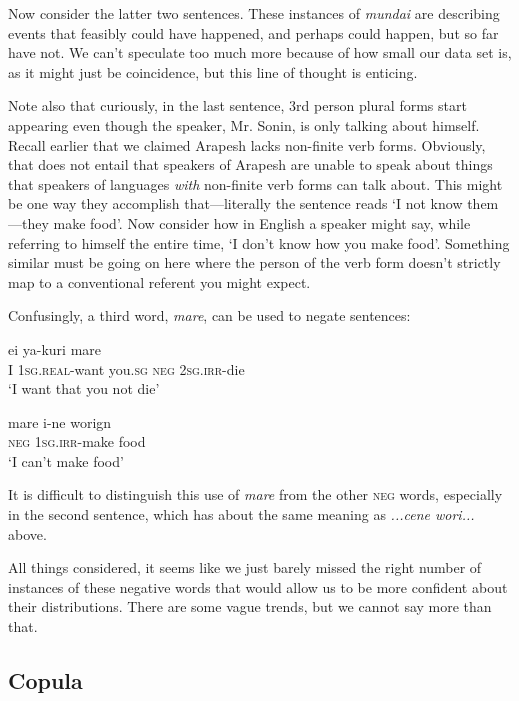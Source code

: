 \documentclass[pdftex,12pt,letterpaper]{article}
\let\ipa\textipa
\let\enya\textltailn
\begin{document}
Now consider the latter two sentences. These instances of \emph{mundai} are describing events that feasibly could have happened, and perhaps could happen, but so far have not. We can't speculate too much more because of how small our data set is, as it might just be coincidence, but this line of thought is enticing.

Note also that curiously, in the last sentence, 3rd person plural forms start appearing even though the speaker, Mr. Sonin, is only talking about himself. Recall earlier that we claimed Arapesh lacks non-finite verb forms. Obviously, that does not entail that speakers of Arapesh are unable to speak about things that speakers of languages \emph{with} non-finite verb forms can talk about. This might be one way they accomplish that---literally the sentence reads `I not know them---they make food'. Now consider how in English a speaker might say, while referring to himself the entire time, `I don't know how you make food'. Something similar must be going on here where the person of the verb form doesn't strictly map to a conventional referent you might expect.

Confusingly, a third word, \emph{mare}, can be used to negate sentences:

\begin{exe}
\ex\gll ei ya-kuri \ipa{\enya@k} mare \ipa{\enya u-g@k} \\
I \textsc{1sg.real}-want you.\textsc{sg} \textsc{neg} \textsc{2sg.irr}-die \\
\trans `I want that you not die'

\ex\gll mare i-ne worig\ipa{1}n \\
\textsc{neg} \textsc{1sg.irr}-make food \\
\trans `I can't make food'
\end{exe}

\noindent It is difficult to distinguish this use of \emph{mare} from the other \textsc{neg} words, especially in the second sentence, which has about the same meaning as \emph{...cene wori\ipa{g1n}...} above.

All things considered, it seems like we just barely missed the right number of instances of these negative words that would allow us to be more confident about their distributions. There are some vague trends, but we cannot say more than that.

 \subsection{Copula}
\end{document}
